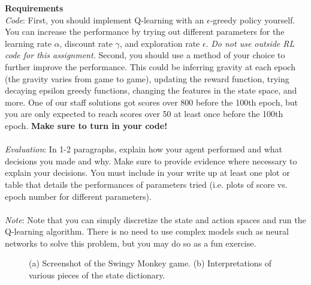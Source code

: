 \documentclass[submit]{../harvardml}
\begin{document}
\begin{problem}
\textbf{Requirements}
\\
\textit{Code}: First, you should implement Q-learning with an
$\epsilon$-greedy policy yourself. You can increase the performance by
trying out different parameters for the learning rate $\alpha$,
discount rate $\gamma$, and exploration rate $\epsilon$. \emph{Do not use outside RL code for this assignment.} Second, you should use a method of your choice to further improve the performance. This could be inferring gravity at each epoch (the gravity varies from game to game), updating the reward function, trying decaying epsilon greedy functions, changing the features in the state space, and more. One of our staff solutions got scores over 800 before the 100th epoch, but you are only expected to reach scores over 50 at least once before the 100th epoch. {\bf Make sure to turn in your code!} \\\\

\textit{Evaluation}: In 1-2 paragraphs, explain how your agent performed and what decisions you made and why. Make sure to provide evidence where necessary to explain your decisions. You must include in your write up at least one plot or table that details the performances of parameters tried (i.e. plots of score vs. epoch number for different parameters). \\\\

\textit{Note}: Note that you can simply discretize the state and action spaces and run the Q-learning algorithm. There is no need to use complex models such as neural networks to solve this problem, but you may do so as a fun exercise.

\end{problem}
\begin{figure}[H]
    \centering%
    \hfill
    \caption{(a) Screenshot of the Swingy Monkey game.  (b) Interpretations of various pieces of the state dictionary.}
\end{figure}
\end{document}
